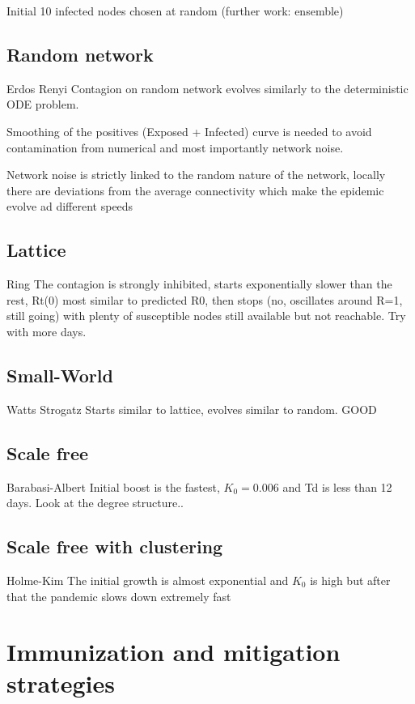 \documentclass[DIV=12, BCOR=0pt]{scrartcl}  %
\begin{document}
  
  Initial 10 infected nodes chosen at random (further work: ensemble)
  
  \subsection{Random network}
  Erdos Renyi
  Contagion on random network evolves similarly to the deterministic ODE problem. 
  
  Smoothing of the positives (Exposed + Infected) curve is needed to avoid contamination from numerical and most importantly network noise. 
  
  Network noise is strictly linked to the random nature of the network, locally there are deviations from the average connectivity which make the epidemic evolve ad different speeds
  
  
  \subsection{Lattice}
  Ring
  The contagion is strongly inhibited, starts exponentially slower than the rest, Rt(0) most similar to predicted R0,
  then stops (no, oscillates around R=1, still going) with plenty of susceptible nodes still available but not reachable. Try with more days.
  
  
  \subsection{Small-World}
  Watts Strogatz
  Starts similar to lattice, evolves similar to random. GOOD
  
  \subsection{Scale free}
  Barabasi-Albert
  Initial boost is the fastest, $K_{0}=0.006$ and Td is less than 12 days. Look at the degree structure..
  
  
  \subsection{Scale free with clustering}
  Holme-Kim
  The initial growth is almost exponential and $K_{0}$ is high but after that the pandemic slows down extremely fast
  
  
  
  
  
  
  \section{Immunization and mitigation strategies}
\end{document}
